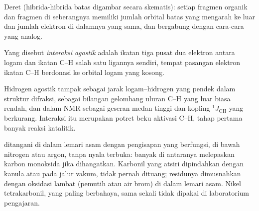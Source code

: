 \begin{omfigure}

{\small Deret  (hibrida-hibrida batas digambar secara skematis): setiap fragmen
organik dan fragmen  di seberangnya memiliki jumlah orbital batas yang mengarah
ke luar dan jumlah elektron di dalamnya yang sama, dan bergabung dengan
cara-cara yang analog.}
\end{omfigure}

\begin{definition}\label{def:b3:organometallic-bonding:agostic}
Yang disebut \emph{interaksi agostik} adalah ikatan tiga pusat
dua elektron antara logam dan ikatan C--H salah satu ligannya sendiri, tempat
pasangan elektron ikatan C--H berdonasi ke orbital logam yang kosong.
\end{definition}

Hidrogen agostik tampak sebagai jarak logam--hidrogen yang pendek dalam struktur
difraksi, sebagai bilangan gelombang uluran C--H yang luar biasa rendah, dan dalam NMR sebagai
geseran medan tinggi dan kopling $^1J_{\mathrm{CH}}$ yang berkurang. Interaksi itu merupakan potret beku
aktivasi C--H, tahap pertama banyak reaksi katalitik.

\begin{inthelab}
 ditangani di dalam lemari asam dengan pengisapan yang berfungsi, di bawah
nitrogen atau argon, tanpa nyala terbuka: banyak di antaranya melepaskan karbon monoksida jika
dihangatkan. Karbonil yang atsiri dipindahkan dengan kanula atau pada jalur vakum, tidak pernah
dituang; residunya dimusnahkan dengan oksidasi lambat (pemutih atau air brom) di dalam
lemari asam. Nikel tetrakarbonil, yang paling berbahaya, sama sekali tidak dipakai di laboratorium
pengajaran.
\end{inthelab}

